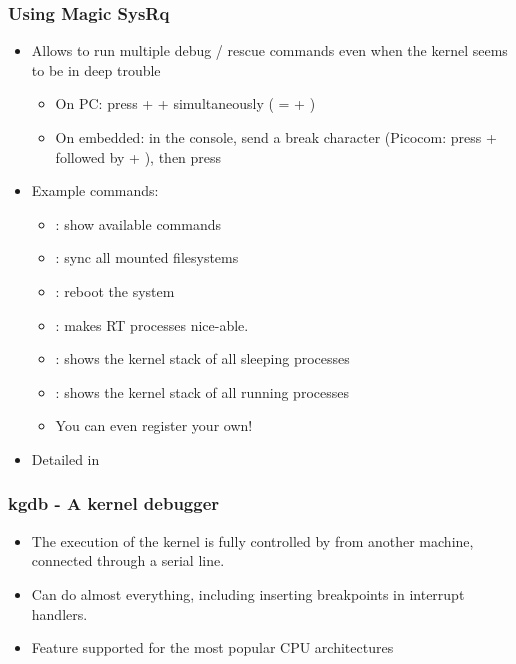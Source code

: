 \begin{frame}
  \frametitle{Using Magic SysRq}
  \begin{itemize}
  \item Allows to run multiple debug / rescue commands even when the
    kernel seems to be in deep trouble
    \begin{itemize}
    \item On PC: press \code{[Alt]} +  + 
	  simultaneously (\code{[SysRq]} = \code{[Alt]} + )
    \item On embedded: in the console, send a break character
      (Picocom: press \code{[Ctrl]} +  followed by \code{[Ctrl]}
      + \code{\ }), then press 
    \end{itemize}
  \item Example commands:
    \begin{itemize}
    \item {}: show available commands 
    \item {}: sync all mounted filesystems
    \item {}: reboot the system
    \item {}: makes RT processes nice-able.
    \item {}: shows the kernel stack of all sleeping processes
    \item {}: shows the kernel stack of all running processes
    \item You can even register your own!
    \end{itemize}
  \item Detailed in 
  \end{itemize}
\end{frame}

\begin{frame}
  \frametitle{kgdb - A kernel debugger}
  \begin{itemize}
  \item The execution of the kernel is fully controlled by 
    from another machine, connected through a serial line.
  \item Can do almost everything, including inserting breakpoints in
    interrupt handlers.
  \item Feature supported for the most popular CPU architectures
  \end{itemize}
\end{frame}

